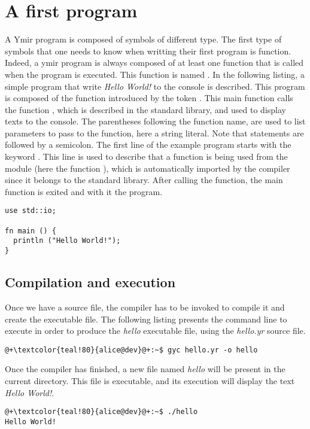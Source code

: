 \section{A first program}

A Ymir program is composed of symbols of different type. The first type of
symbols that one needs to know when writting their first program is function.
Indeed, a ymir program is always composed of at least one function that is
called when the program is executed. This function is named . In the
following listing, a simple program that write \textit{Hello World!} to the
console is described. This program is composed of the function 
introduced by the token . This main function calls the function
, which is described in the standard library, and used
to display texts to the console. The parentheses following the 
function name, are used to list parameters to pass to the function, here a
string literal. Note that statements are followed by a semicolon. The first line
of the example program starts with the keyword . This line is used to
describe that a function is being used from the  module (here the
function ), which is automatically imported by the compiler since
it belongs to the standard library. After calling the 
function, the main function is exited and with it the program.

\begin{lstlisting}[style=coloredverbatim, caption=Source file \textit{hello.yr}]
use std::io;

fn main () {
  println ("Hello World!");
}
\end{lstlisting}


\subsection{Compilation and execution}

Once we have a source file, the compiler has to be invoked to compile it and
create the executable file. The following listing presents the command line to
execute in order to produce the \textit{hello} executable file, using the
\textit{hello.yr} source file.

\begin{lstlisting}[style=bashVerb, escapechar=@+]
@+\textcolor{teal!80}{alice@dev}@+:~$ gyc hello.yr -o hello
\end{lstlisting}

Once the compiler has finished, a new file named \textit{hello} will be present
in the current directory. This file is executable, and its execution will
display the text \textit{Hello World!}.

\begin{lstlisting}[style=bashVerb, escapechar=@+]
@+\textcolor{teal!80}{alice@dev}@+:~$ ./hello
Hello World!
\end{lstlisting}





